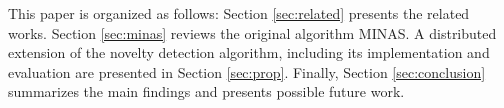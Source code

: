 This paper  is organized as follows:
Section \ref{sec:related} presents the related works.
Section \ref{sec:minas} reviews the original algorithm MINAS.
A distributed extension of the novelty detection algorithm, including its
implementation and evaluation are presented in Section \ref{sec:prop}.
Finally, Section \ref{sec:conclusion} summarizes the main findings and presents
possible future work.








